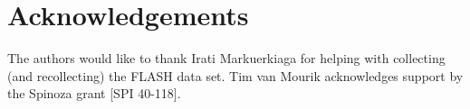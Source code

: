 \section{Acknowledgements}
The authors would like to thank Irati Markuerkiaga for helping with collecting (and recollecting) the FLASH data set. Tim van Mourik acknowledges support by the Spinoza grant [SPI 40-118].